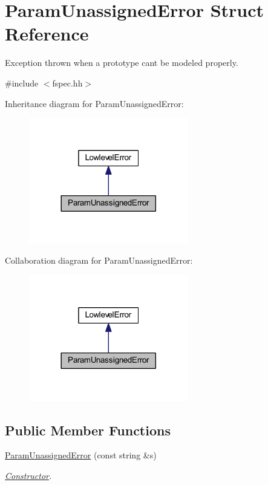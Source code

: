 \hypertarget{struct_param_unassigned_error}{}\section{Param\+Unassigned\+Error Struct Reference}
\label{struct_param_unassigned_error}


Exception thrown when a prototype can\textquotesingle{}t be modeled properly.  




{\ttfamily \#include $<$fspec.\+hh$>$}



Inheritance diagram for Param\+Unassigned\+Error\+:
\nopagebreak
\begin{figure}[H]
\begin{center}
\leavevmode
\includegraphics[width=197pt]{struct_param_unassigned_error__inherit__graph}
\end{center}
\end{figure}


Collaboration diagram for Param\+Unassigned\+Error\+:
\nopagebreak
\begin{figure}[H]
\begin{center}
\leavevmode
\includegraphics[width=197pt]{struct_param_unassigned_error__coll__graph}
\end{center}
\end{figure}
\subsection*{Public Member Functions}
\begin{DoxyCompactItemize}
\item 
\mbox{\hyperlink{struct_param_unassigned_error_a07aae61447f2c586e1a66667ea150615}{Param\+Unassigned\+Error}} (const string \&s)
\begin{DoxyCompactList}\small\item\em \mbox{\hyperlink{class_constructor}{Constructor}}. \end{DoxyCompactList}\end{DoxyCompactItemize}
